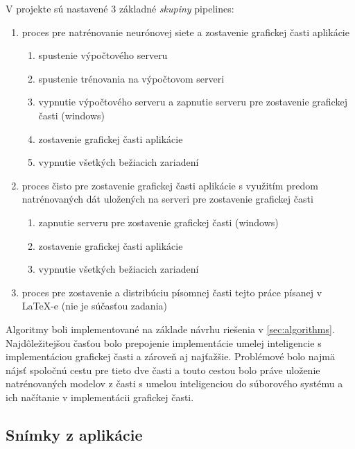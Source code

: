 V projekte sú nastavené 3 základné \emph{skupiny} pipelines:
\begin{enumerate}
    \item proces pre natrénovanie neurónovej siete a zostavenie grafickej časti aplikácie
        \begin{enumerate}
            \item spustenie výpočtového serveru
            \item spustenie trénovania na výpočtovom serveri
            \item vypnutie výpočtového serveru a zapnutie serveru pre zostavenie grafickej časti (windows)
            \item zostavenie grafickej časti aplikácie
            \item vypnutie všetkých bežiacich zariadení
        \end{enumerate}
    \item proces čisto pre zostavenie grafickej časti aplikácie s využitím predom natrénovaných dát uložených na serveri
        pre zostavenie grafickej časti
        \begin{enumerate}
            \item zapnutie serveru pre zostavenie grafickej časti (windows)
            \item zostavenie grafickej časti aplikácie
            \item vypnutie všetkých bežiacich zariadení
        \end{enumerate}
    \item proces pre zostavenie a distribúciu písomnej časti tejto práce písanej v LaTeX-e\cite{latex}
        (nie je súčasťou zadania)
\end{enumerate}

Algoritmy boli implementované na základe návrhu riešenia v \autoref{sec:algorithms}.
Najdôležitejšou časťou bolo prepojenie implementácie umelej inteligencie s implementáciou grafickej časti a zároveň aj
najťažšie.
Problémové bolo najmä nájsť spoločnú cestu pre tieto dve časti a touto cestou bolo práve uloženie natrénovaných modelov
z časti s umelou inteligenciou do súborového systému a ich načítanie v implementácii grafickej časti.

\subsection{Snímky z aplikácie}\label{subsec:screenshots}

